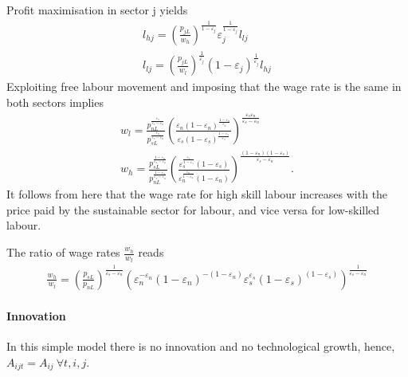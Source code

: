 Profit maximisation in sector j yields
\begin{align*}
l_{hj}= \left(\frac{p_{jL}}{w_h}\right)^{\frac{1}{1-\varepsilon_j}}\varepsilon_j^{\frac{1}{1-\varepsilon_j}}l_{lj}\\
l_{lj}= \left(\frac{p_{jL}}{w_l}\right)^\frac{1}{\varepsilon_j}(1-\varepsilon_j)^\frac{1}{\varepsilon_j}l_{hj}
\end{align*}
Exploiting free labour movement and imposing that the wage rate is the same in both sectors implies
\begin{align*}
 w_l= \frac{p_{nL}^\frac{\varepsilon_s}{\varepsilon_s-\varepsilon_n}}{p_{sL}^\frac{\varepsilon_n}{\varepsilon_s-\varepsilon_n}}\left(\frac{\varepsilon_n(1-\varepsilon_n)^\frac{1-\varepsilon_n}{\varepsilon_n}}{\varepsilon_s(1-\varepsilon_s)^\frac{1-\varepsilon_s}{\varepsilon_s}}\right)^\frac{\varepsilon_s\varepsilon_n}{\varepsilon_s-\varepsilon_n}\\
 w_h= \frac{p_{sL}^\frac{1-\varepsilon_n}{\varepsilon_s-\varepsilon_n}}{p_{nL}^\frac{1-\varepsilon_s}{\varepsilon_s-\varepsilon_n}}\left(\frac{\varepsilon_s^\frac{\varepsilon_s}{1-\varepsilon_s}(1-\varepsilon_s)}{\varepsilon_n^\frac{\varepsilon_n}{1-\varepsilon_n}(1-\varepsilon_n)}\right)^\frac{(1-\varepsilon_n)(1-\varepsilon_s)}{\varepsilon_s-\varepsilon_n}.
\end{align*}
It follows from here that the wage rate for high skill labour increases with the price paid by the sustainable sector for labour, and vice versa for low-skilled labour. 

The ratio of wage rates $\frac{w_h}{w_l}$ reads
\begin{align}
\frac{w_h}{w_l}=\left(\frac{p_{sL}}{p_{nL}}\right)^\frac{1}{\varepsilon_s-\varepsilon_n}\left(\varepsilon_n^{-\varepsilon_n} (1-\varepsilon_n)^{-(1-\varepsilon_n)}\varepsilon_s^{\varepsilon_s} (1-\varepsilon_s)^{(1-\varepsilon_s)} \right)^\frac{1}{\varepsilon_s-\varepsilon_n}\label{eq:labourFirm_labrel}
\end{align}

\paragraph{Innovation}
In this simple model there is no innovation and no technological growth, hence, $A_{ijt}=A_{ij}\ \forall t, i, j$.


